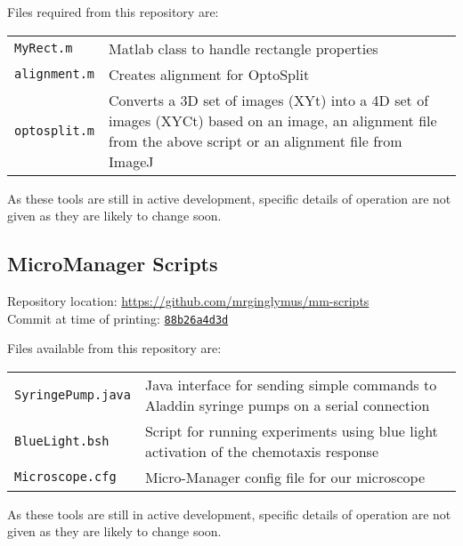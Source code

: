 \documentclass[../main.tex]{subfiles}
\begin{document}
Files required from this repository are:


\begin{tabular}{lp{12cm}}
\texttt{MyRect.m}	&	Matlab class to handle rectangle properties \\
\texttt{alignment.m}	&	Creates alignment for OptoSplit \\
\texttt{optosplit.m}	&	Converts a 3D set of images (XYt) into a 4D set of images (XYCt) based on an image, an alignment file from the above script or an alignment file from ImageJ
\end{tabular}

As these tools are still in active development, specific details of operation are not given as they are likely to change soon.

\subsection{MicroManager Scripts}
\label{sec:scripts:micromanager}

Repository location: \url{https://github.com/mrginglymus/mm-scripts}\\
Commit at time of printing: \href{https://github.com/mrginglymus/mm-scripts/tree/88b26a4d3db8fb4904cfaae76df14207a233072f}{\texttt{88b26a4d3d}}

Files available from this repository are:

\begin{tabular}{lp{12cm}}
\texttt{SyringePump.java}	&	Java interface for sending simple commands to Aladdin syringe pumps on a serial connection \\
\texttt{BlueLight.bsh}	&	Script for running experiments using blue light activation of the chemotaxis response \\
\texttt{Microscope.cfg}	&	Micro-Manager config file for our microscope
\end{tabular}

As these tools are still in active development, specific details of operation are not given as they are likely to change soon.
\end{document}
